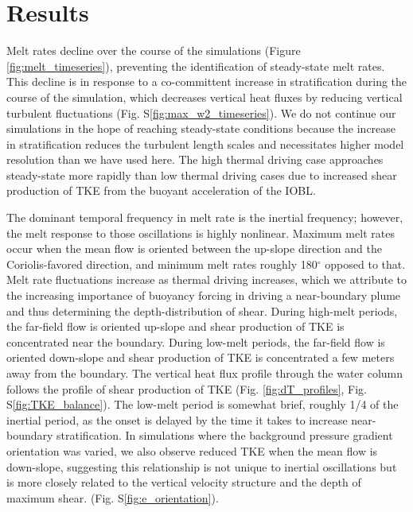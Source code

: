 \documentclass[draft]{styles/agujournal2019}
\begin{document}
\section{Results}

Melt rates decline over the course of the simulations (Figure \ref{fig:melt_timeseries}), preventing the identification of steady-state melt rates. 
This decline is in response to a co-committent increase in stratification during the course of the simulation, which decreases vertical heat fluxes by reducing vertical turbulent fluctuations (Fig. S\ref{fig:max_w2_timeseries}). We do not continue our simulations in the hope of reaching steady-state conditions because the increase in stratification reduces the turbulent length scales and necessitates higher model resolution than we have used here. The high thermal driving case approaches steady-state more rapidly than low thermal driving cases due to increased shear production of TKE from the buoyant acceleration of the IOBL.

The dominant temporal frequency in melt rate is the inertial frequency; however, the melt response to those oscillations is highly nonlinear. Maximum melt rates occur when the mean flow is oriented between the up-slope direction and the Coriolis-favored direction, and minimum melt rates roughly 180$^{\circ}$ opposed to that. Melt rate fluctuations increase as thermal driving increases, which we attribute to the increasing importance of buoyancy forcing in driving a near-boundary plume and thus determining the depth-distribution of shear. During high-melt periods, the far-field flow is oriented up-slope and shear production of TKE is concentrated near the boundary. During low-melt periods, the far-field flow is oriented down-slope and shear production of TKE is concentrated a few meters away from the boundary. The vertical heat flux profile through the water column follows the profile of shear production of TKE (Fig. \ref{fig:dT_profiles}, Fig. S\ref{fig:TKE_balance}). The low-melt period is somewhat brief, roughly 1/4 of the inertial period, as the onset is delayed by the time it takes to increase near-boundary stratification. In simulations where the background pressure gradient orientation was varied, we also observe reduced TKE when the mean flow is down-slope, suggesting this relationship is not unique to inertial oscillations but is more closely related to the vertical velocity structure and the depth of maximum shear. (Fig. S\ref{fig:e_orientation}).
\end{document}
